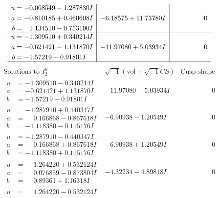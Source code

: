 \documentclass[1p]{elsarticle_modified}
\theoremstyle{definition}
\newcommand{\I}{\sqrt{-1}}
\begin{document}
$$\begin{array}{c|c|c}
\begin{aligned}
u &= -0.068549 - 1.287830 I \\
a &= -0.810185 + 0.460608 I \\
b &= \phantom{-}1.134510 - 0.753190 I\end{aligned}
 & -6.18575 + 11.73780 I & \phantom{-0.000000 } 0 \\ \hline\begin{aligned}
u &= -1.309510 + 0.340214 I \\
a &= -0.621421 - 1.131870 I \\
b &= -1.57219 + 0.91801 I\end{aligned}
 & -11.97080 + 5.03934 I & \phantom{-0.000000 } 0\\
 \hline 
 \end{array}$$\newpage$$\begin{array}{c|c|c}  
\text{Solutions to }I^u_{2}& \I (\text{vol} + \sqrt{-1}CS) & \text{Cusp shape}\\
 \hline 
\begin{aligned}
u &= -1.309510 - 0.340214 I \\
a &= -0.621421 + 1.131870 I \\
b &= -1.57219 - 0.91801 I\end{aligned}
 & -11.97080 - 5.03934 I & \phantom{-0.000000 } 0 \\ \hline\begin{aligned}
u &= -1.287910 + 0.440347 I \\
a &= \phantom{-}0.166868 - 0.867618 I \\
b &= -1.118380 - 0.115176 I\end{aligned}
 & -6.90938 - 1.20549 I & \phantom{-0.000000 } 0 \\ \hline\begin{aligned}
u &= -1.287910 - 0.440347 I \\
a &= \phantom{-}0.166868 + 0.867618 I \\
b &= -1.118380 + 0.115176 I\end{aligned}
 & -6.90938 + 1.20549 I & \phantom{-0.000000 } 0 \\ \hline\begin{aligned}
u &= \phantom{-}1.264220 + 0.532124 I \\
a &= \phantom{-}0.076859 - 0.873804 I \\
b &= \phantom{-}0.89361 + 1.16318 I\end{aligned}
 & -4.32234 - 4.89818 I & \phantom{-0.000000 } 0 \\ \hline\begin{aligned}
u &= \phantom{-}1.264220 - 0.532124 I \\

\end{aligned}
\end{array}$$
\end{document}
